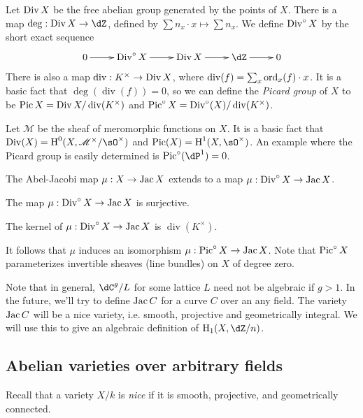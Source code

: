 Let $\operatorname{Div} X$ be the free abelian group generated by the points of $X$. There 
is a map $\deg:\divisor X\to \dZ$, defined by 
$\sum n_x\cdot x\mapsto \sum n_x$. We define $\operatorname{Div}^\circ X$ by the short exact 
sequence 
\[\xymatrix{
  0 \ar[r]
    & \divisor^\circ X \ar[r]
    & \divisor X \ar[r]
    & \dZ \ar[r]
    & 0
}\]
There is also a map $\operatorname{div}:K^\times\to \operatorname{Div} X$, where 
$\operatorname{div}(f) = \sum_x \operatorname{ord}_x(f)\cdot x$. It is a basic fact that 
$\deg(\operatorname{div}(f)) = 0$, so we can define the \emph{Picard group} 
of $X$ to be $\operatorname{Pic} X = \operatorname{Div} X/\operatorname{div}(K^\times)$ and 
$\operatorname{Pic}^\circ X = \operatorname{Div}^\circ (X)/\operatorname{div}(K^\times)$. 

Let $\mathscr{M}$ be the sheaf of meromorphic functions on $X$. It is a basic 
fact that $\divisor(X)=\h^0(X,\mathscr{M}^\times/\sO^\times)$ and 
$\picard(X)=\h^1(X,\sO^\times)$. An example where the Picard group is easily 
determined is $\picard^\circ(\dP^1) = 0$.

The Abel-Jacobi map $\mu:X\to \operatorname{Jac} X$ extends to a map 
$\mu:\operatorname{Div}^\circ X\to \operatorname{Jac} X$. 

\begin{theorem}[Jacobi]
The map $\mu:\operatorname{Div}^\circ X\to\operatorname{Jac} X$ is surjective.
\end{theorem}

\begin{theorem}[Abel]
The kernel of $\mu:\operatorname{Div}^\circ X\to \operatorname{Jac} X$ is $\operatorname{div}(K^\times)$. 
\end{theorem}

It follows that $\mu$ induces an isomorphism $\mu:\operatorname{Pic}^\circ X\to \operatorname{Jac} X$. 
Note that $\operatorname{Pic}^\circ X$ parameterizes invertible sheaves (line bundles) on 
$X$ of degree zero. 

Note that in general, $\dC^g/L$ for some lattice $L$ need not be 
algebraic if $g>1$. In the future, we'll try to define $\operatorname{Jac} C$ for a curve 
$C$ over an any field. The variety $\operatorname{Jac} C$ will be a nice variety, i.e. 
smooth, projective and geometrically integral. We will use this to give an 
algebraic definition of $\h_1(X,\dZ/n)$. 





\subsection{Abelian varieties over arbitrary fields}

Recall that a variety $X/k$ is \emph{nice} if it is smooth, projective, and 
geometrically connected. 

